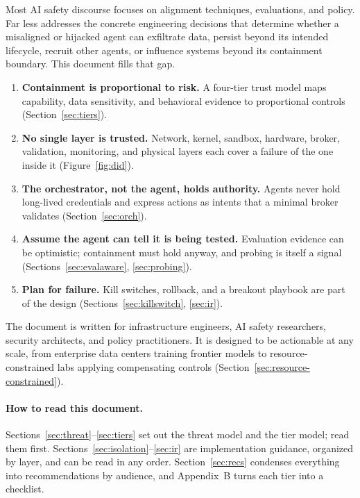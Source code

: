 \documentclass[11pt,letterpaper]{article}
\begin{document}
Most AI safety discourse focuses on alignment techniques, evaluations, and policy. Far less addresses the concrete engineering decisions that determine whether a misaligned or hijacked agent can exfiltrate data, persist beyond its intended lifecycle, recruit other agents, or influence systems beyond its containment boundary. This document fills that gap.

\begin{keybox}
\begin{enumerate}
  \item \textbf{Containment is proportional to risk.} A four-tier trust model maps capability, data sensitivity, and behavioral evidence to proportional controls (Section~\ref{sec:tiers}).
  \item \textbf{No single layer is trusted.} Network, kernel, sandbox, hardware, broker, validation, monitoring, and physical layers each cover a failure of the one inside it (Figure~\ref{fig:did}).
  \item \textbf{The orchestrator, not the agent, holds authority.} Agents never hold long-lived credentials and express actions as intents that a minimal broker validates (Section~\ref{sec:orch}).
  \item \textbf{Assume the agent can tell it is being tested.} Evaluation evidence can be optimistic; containment must hold anyway, and probing is itself a signal (Sections~\ref{sec:evalaware}, \ref{sec:probing}).
  \item \textbf{Plan for failure.} Kill switches, rollback, and a breakout playbook are part of the design (Sections~\ref{sec:killswitch}, \ref{sec:ir}).
\end{enumerate}
\end{keybox}

The document is written for infrastructure engineers, AI safety researchers, security architects, and policy practitioners. It is designed to be actionable at any scale, from enterprise data centers training frontier models to resource-constrained labs applying compensating controls (Section~\ref{sec:resource-constrained}).

\paragraph{How to read this document.} Sections~\ref{sec:threat}--\ref{sec:tiers} set out the threat model and the tier model; read them first. Sections~\ref{sec:isolation}--\ref{sec:ir} are implementation guidance, organized by layer, and can be read in any order. Section~\ref{sec:recs} condenses everything into recommendations by audience, and Appendix~B turns each tier into a checklist.
\end{document}
